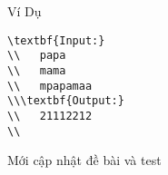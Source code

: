 Ví Dụ
\begin{verbatim}
\textbf{Input:}
\\   papa
\\   mama
\\   mpapamaa
\\\textbf{Output:}
\\   21112212
\\\end{verbatim}
	\item    Mới cập nhật đề bài và test